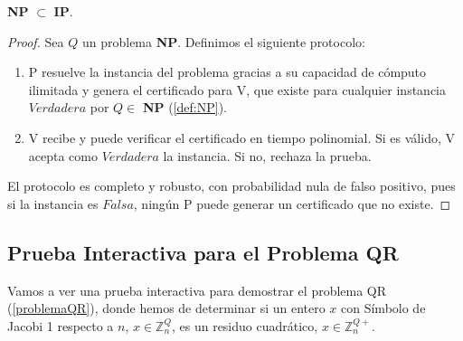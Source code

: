 \begin{proposition}
	\textbf{NP} $\subset$ \textbf{IP}.
\end{proposition}

\begin{proof}
	Sea $Q$ un problema \textbf{NP}. Definimos el siguiente protocolo:

	\begin{enumerate}
		\item  P resuelve la instancia del problema gracias a su capacidad de cómputo ilimitada y genera el certificado para V, que existe para cualquier instancia $Verdadera$ por $Q\in$ \textbf{NP} (\ref{def:NP}).
		\item  V recibe y puede verificar el certificado en tiempo polinomial. Si es válido, V acepta como $Verdadera$ la instancia. Si no, rechaza la prueba.
	\end{enumerate}

	El protocolo es completo y robusto, con probabilidad nula de falso positivo, pues si la instancia es $Falsa$, ningún P puede generar un certificado que no existe.

\end{proof}



\subsection{Prueba Interactiva para el Problema QR}

Vamos a ver una prueba interactiva para demostrar el problema QR (\autoref{problemaQR}), donde hemos de determinar si un entero $x$ con Símbolo de Jacobi 1 respecto a $n$, $x \in \mathbb{Z}^Q_n$, es un residuo cuadrático, $x \in \mathbb{Z}^{Q+}_n$.

\hfil

